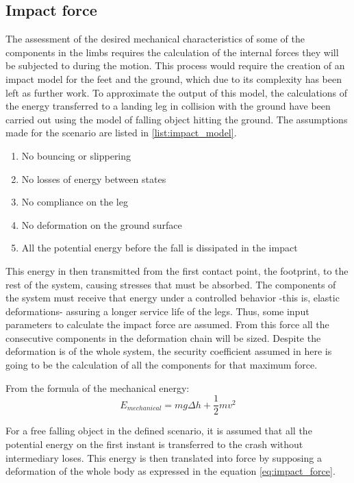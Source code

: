 \subsection{Impact force} %
\label{sub:impact_force}
The assessment of the desired mechanical characteristics of some of the components in the limbs requires the calculation of the internal forces they will be subjected to during the motion.
This process would require the creation of an impact model for the feet and the ground, which due to its complexity has been left as further work.
To approximate the output of this model, the calculations of the energy transferred to a landing leg in collision with the ground have been carried out using the model of falling object hitting the ground.
The assumptions made for the scenario are listed in \ref{list:impact_model}.

\begin{enumerate}
\label{list:impact_model}
	\item No bouncing or slippering 
	\item No losses of energy between states
	\item No compliance on the leg
	\item No deformation on the ground surface
	\item All the potential energy before the fall is dissipated in the impact 
\end{enumerate}

This energy in then transmitted from the first contact point, the footprint, to the rest of the system, causing stresses that must be absorbed.
The components of the system must receive that energy under a controlled behavior -this is, elastic deformations- assuring a longer service life of the legs.
Thus, some input parameters to calculate the impact force are assumed.
From this force all the consecutive components in the deformation chain will be sized.
Despite the deformation is of the whole system, the security coefficient assumed in here is going to be the calculation of all the components for that maximum force.

From the formula of the mechanical energy:
\begin{equation}
  E_{mechanical} = m g \Delta h + \frac{1}{2} m v^{2}
\end{equation}

For a free falling object in the defined scenario, it is assumed that all the potential energy on the first instant is transferred to the crash without intermediary loses.
This energy is then translated into force by supposing a deformation of the whole body as expressed in the equation \ref{eq:impact_force}.

